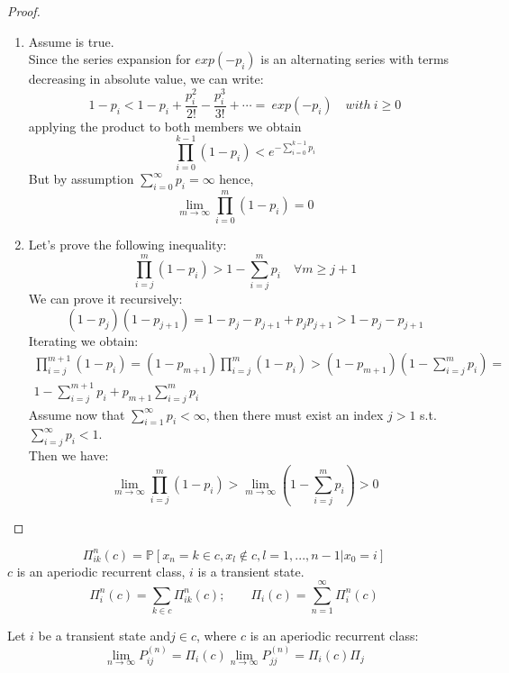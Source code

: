 	\begin{proof}
		\begin{enumerate}
			\item Assume  is true. \\
				Since the series expansion for $exp(-p_i)$ is an alternating series with terms decreasing in absolute value, we can write:
				\begin{equation}
					1-p_i < 1-p_i + \frac{p_i^2}{2!} - \frac{p_i^3}{3!} + \cdots = ~exp(-p_i) \quad with ~i\ge 0
				\end{equation}
				applying the product to both members we obtain
				\begin{equation}
					\prod_{i=0}^{k-1} (1-p_i) < e^{-\sum_{i=0}^{k-1}p_i}
				\end{equation}
				But by assumption $\sum_{i=0}^\infty p_i = \infty$ hence,
				$$ \lim_{m \to \infty} \prod_{i=0}^{m}(1-p_i) = 0 $$
			
			\item Let's prove the following inequality:
			$$ \prod_{i=j}^m(1-p_i) > 1-\sum_{i=j}^m p_i \quad \forall m \ge j+1$$
			We can prove it recursively:
			$$(1-p_j)(1-p_{j+1}) = 1-p_j - p_{j+1} + p_jp_{j+1} > 1-p_j - p_{j+1}$$
			Iterating we obtain:
			\begin{eqnarray*}
				\prod_{i=j}^{m+1}(1-p_i) = (1-p_{m+1})\prod_{i=j}^m(1-p_i) > (1-p_{m+1})(1-\sum_{i=j}^m p_i) = \\
				1- \sum_{i=j}^{m+1} p_i + p_{m+1}\sum_{i=j}^m p_i
			\end{eqnarray*}
			Assume now that $\sum_{i=1}^\infty p_i < \infty$, then there must exist an index $j>1$ s.t. $\sum_{i=j}^\infty p_i < 1$. \\
			Then we have:
			$$ \lim_{m \to \infty} \prod_{i=j}^m (1-p_i) > \lim_{m \to \infty} (1-\sum_{i=j}^m p_i) > 0 $$
		\end{enumerate}
	\end{proof}

	\begin{definition}[lesson 22/03/17]
		$$\Pi_{ik}^n(c) = \mathbb{P}[x_n = k \in c, x_l \notin c, l=1, ... , n-1 | x_0 =i]$$
		$c$ is an aperiodic recurrent class, $i$ is a transient state.
		$$\Pi_i^n(c) = \sum_{k \in c} \Pi_{ik}^n(c); \qquad \Pi_i(c) = \sum_{n=1}^\infty \Pi_i^n(c)$$
	\end{definition}

	\begin{theorem}
		Let $i$ be a transient state and$j \in c$, where $c$ is an aperiodic recurrent class:
		$$\lim_{n\to\infty} P_{ij}^{(n)} = \Pi_i(c) \lim_{n\to\infty} P_{jj}^{(n)} = \Pi_i(c) \Pi_j$$
	\end{theorem}





